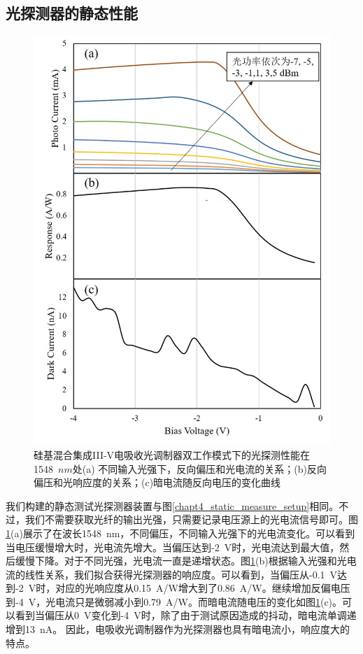 \subsection{光探测器的静态性能}
\begin{figure}[htb]
	\centering
	\includegraphics[width=12cm]{./Pictures/chapt4_pd_static.jpg}
	\caption{硅基混合集成III-V电吸收光调制器双工作模式下的光探测性能在1548~$n m$处(a) 不同输入光强下，反向偏压和光电流的关系；(b)反向偏压和光响应度的关系；(c)暗电流随反向电压的变化曲线}
	\label{chapt4_pd_static}
\end{figure}
我们构建的静态测试光探测器装置与图\ref{chapt4_static_measure_setup}相同。不过，我们不需要获取光纤的输出光强，只需要记录电压源上的光电流信号即可。图\ref{chapt4_pd_static}(a)展示了在波长1548~nm，不同偏压，不同输入光强下的光电流变化。可以看到当电压缓慢增大时，光电流先增大。当偏压达到-2~V时，光电流达到最大值，然后缓慢下降。对于不同光强，光电流一直是递增状态。图\ref{chapt4_pd_static}(b)根据输入光强和光电流的线性关系，我们拟合获得光探测器的响应度。可以看到，当偏压从-0.1~V达到-2~V时，对应的光响应度从0.15~A/W增大到了0.86~A/W。继续增加反偏电压到-4~V，光电流只是微弱减小到0.79~A/W。而暗电流随电压的变化如图\ref{chapt4_pd_static}(c)。可以看到当偏压从0~V变化到-4~V时，除了由于测试原因造成的抖动，暗电流单调递增到13~nA。 因此，电吸收光调制器作为光探测器也具有暗电流小，响应度大的特点。

